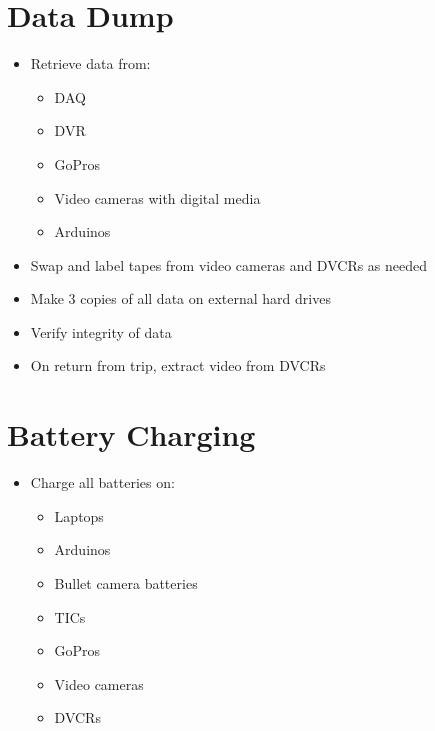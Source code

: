 \documentclass[11pt,oneside]{book}
\begin{document}
\section{Data Dump}

\begin{itemize}
\item Retrieve data from:
    \begin{itemize}
    \item DAQ
    \item DVR
    \item GoPros
    \item Video cameras with digital media
    \item Arduinos
    \end{itemize}

\item Swap and label tapes from video cameras and DVCRs as needed

\item Make 3 copies of all data on external hard drives

\item Verify integrity of data

\item On return from trip, extract video from DVCRs
\end{itemize}

\section{Battery Charging}

\begin{itemize}
\item Charge all batteries on:
    \begin{itemize}
    \item Laptops
    \item Arduinos
    \item Bullet camera batteries
    \item TICs
    \item GoPros
    \item Video cameras
    \item DVCRs
    \end{itemize}
\end{itemize}
\end{document}
